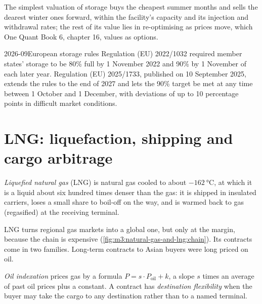 The simplest valuation of storage buys the cheapest summer months and sells the
dearest winter ones forward, within the facility's capacity and its injection and
withdrawal rates; the rest of its value lies in re-optimising as prices move, which
One Quant Book 6, chapter 16, values as options.

\begin{dated}{2026-09}{European storage rules}\label{dat:m3:natural-gas-and-lng:storage}
Regulation (EU) 2022/1032 required member states' storage to be 80\% full by 1 November
2022 and 90\% by 1 November of each later year. Regulation (EU) 2025/1733, published on
10 September 2025, extends the rules to the end of 2027 and lets the 90\% target be met
at any time between 1 October and 1 December, with deviations of up to 10 percentage
points in difficult market conditions.
\end{dated}

\section{LNG: liquefaction, shipping and cargo arbitrage}

\begin{definition}\label{def:m3:natural-gas-and-lng:lng}
\emph{Liquefied natural gas} (LNG) is natural gas cooled
to about $-\qty{162}{\degreeCelsius}$, at which it is a liquid about six hundred times
denser than the gas: it is shipped in insulated carriers, loses a small share to
boil-off on the way, and is warmed back to gas (regasified) at the receiving terminal.
\end{definition}

LNG turns regional gas markets into a global one, but only at the margin, because the
chain is expensive (\cref{fig:m3:natural-gas-and-lng:chain}). Its contracts come in two
families. Long-term contracts to Asian buyers were long priced on oil.

\begin{definition}\label{def:m3:natural-gas-and-lng:contracts}
\emph{Oil indexation} prices gas by a formula $P = s \cdot P_{\mathrm{oil}}
+ k$, a slope $s$ times an average of past oil prices plus a constant. A contract has
\emph{destination flexibility} when the buyer may take the
cargo to any destination rather than to a named terminal.
\end{definition}


